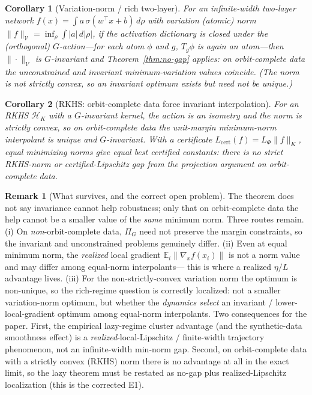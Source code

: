 \documentclass[11pt]{article}
\newtheorem{corollary}{Corollary}
\theoremstyle{definition}
\newtheorem{remark}{Remark}
\newcommand{\E}{\mathbb{E}}
\begin{document}
\begin{corollary}[Variation-norm / rich two-layer]\label{cor:no-gap-var}
For an infinite-width two-layer network $f(x)=\int a\,\sigma(w^\top x+b)\,d\rho$ with variation
(atomic) norm $\|f\|_{\mathcal V}=\inf_\rho\int|a|\,d|\rho|$, if the activation dictionary is closed
under the (orthogonal) $G$-action---for each atom $\phi$ and $g$, $T_g\phi$ is again an atom---then
$\|\cdot\|_{\mathcal V}$ is $G$-invariant and Theorem~\ref{thm:no-gap} applies: on orbit-complete data
the unconstrained and invariant minimum-variation values coincide. (The norm is not strictly convex,
so an invariant optimum \emph{exists} but need not be unique.)
\end{corollary}

\begin{corollary}[RKHS: orbit-complete data force invariant interpolation]\label{cor:no-gap-rkhs}
For an RKHS $\mathcal H_K$ with a $G$-invariant kernel, the action is an isometry and the norm is
strictly convex, so on orbit-complete data the unit-margin minimum-norm interpolant is unique and
$G$-invariant. With a certificate $L_{\mathrm{cert}}(f)=L_\Phi\|f\|_K$, equal minimizing norms give
equal best certified constants: there is \emph{no} strict RKHS-norm or certified-Lipschitz gap from
the projection argument on orbit-complete data.
\end{corollary}

\begin{remark}[What survives, and the correct open problem]\label{rem:no-gap}
The theorem does not say invariance cannot help robustness; only that on orbit-complete data the help
cannot be a smaller value of the \emph{same} minimum norm. Three routes remain. (i) On
\emph{non}-orbit-complete data, $\Pi_G$ need not preserve the margin constraints, so the invariant and
unconstrained problems genuinely differ. (ii) Even at equal minimum norm, the \emph{realized} local
gradient $\E_i\|\nabla_x f(x_i)\|$ is not a norm value and may differ among equal-norm interpolants---
this is where a realized $\eta/L$ advantage lives. (iii) For the non-strictly-convex variation norm the
optimum is non-unique, so the rich-regime question is correctly localized: not a smaller variation-norm
optimum, but whether the \emph{dynamics select} an invariant / lower-local-gradient optimum among
equal-norm interpolants. Two consequences for the paper. First, the empirical lazy-regime cluster
advantage (and the synthetic-data smoothness effect) is a \emph{realized}-local-Lipschitz / finite-width
trajectory phenomenon, not an infinite-width min-norm gap. Second, on orbit-complete data with a
strictly convex (RKHS) norm there is no advantage at all in the exact limit, so the lazy theorem must be
restated as no-gap plus realized-Lipschitz localization (this is the corrected E1).
\end{remark}
\end{document}
